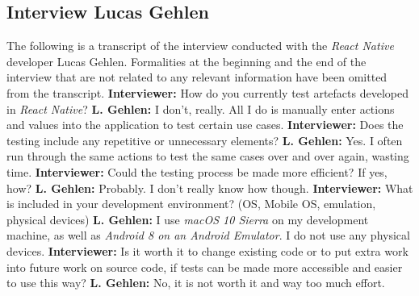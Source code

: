 \patchcmd{\appendices}{\quad}{: }{}{}
\begin{appendices}

\section{Interview Lucas Gehlen}
\label{appendix:interview_lucas_gehlen}

The following is a transcript of the interview conducted with the \textit{React Native} developer Lucas Gehlen. Formalities at the beginning and the end of the interview that are not related to any relevant information have been omitted from the transcript.
\newline
\newline
\textbf{Interviewer:} How do you currently test artefacts developed in \textit{React Native}?
\newline
\newline
\textbf{L. Gehlen:} I don't, really. All I do is manually enter actions and values into the application to test certain use cases.
\newline
\newline
\textbf{Interviewer:} Does the testing include any repetitive or unnecessary elements?
\newline
\newline
\textbf{L. Gehlen:} Yes. I often run through the same actions to test the same cases over and over again, wasting time.
\newline
\newline
\textbf{Interviewer:} Could the testing process be made more efficient? If yes, how?
\newline
\newline
\textbf{L. Gehlen:} Probably. I don't really know how though.
\newline
\newline
\textbf{Interviewer:} What is included in your development environment? (OS, Mobile OS, emulation, physical devices)
\newline
\newline
\textbf{L. Gehlen:} I use \textit{macOS 10 Sierra} on my development machine, as well as \textit{Android 8 on an Android Emulator}. I do not use any physical devices.
\newline
\newline
\textbf{Interviewer:} Is it worth it to change existing code or to put extra work into future work on source code, if tests can be made more accessible and easier to use this way?
\newline
\newline
\textbf{L. Gehlen:} No, it is not worth it and way too much effort.


\end{appendices}
